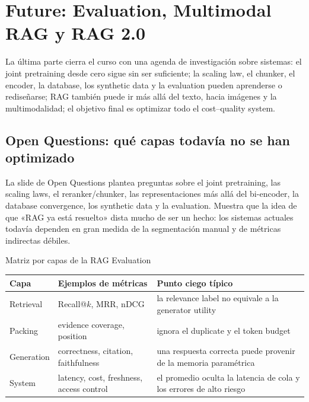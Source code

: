 \section{Future: Evaluation, Multimodal RAG y RAG 2.0}

La última parte cierra el curso con una agenda de investigación sobre sistemas: el joint pretraining desde cero sigue sin ser suficiente; la scaling law, el chunker, el encoder, la database, los synthetic data y la evaluation pueden aprenderse o rediseñarse; RAG también puede ir más allá del texto, hacia imágenes y la multimodalidad; el objetivo final es optimizar todo el cost--quality system.

\subsection{Open Questions: qué capas todavía no se han optimizado}

La slide de Open Questions plantea preguntas sobre el joint pretraining, las scaling laws, el reranker/chunker, las representaciones más allá del bi-encoder, la database convergence, los synthetic data y la evaluation. Muestra que la idea de que «RAG ya está resuelto» dista mucho de ser un hecho: los sistemas actuales todavía dependen en gran medida de la segmentación manual y de métricas indirectas débiles.


\begin{knowledgebox}{Matriz por capas de la RAG Evaluation}
\begin{tabularx}{\textwidth}{L{0.18\textwidth}>{\raggedright\arraybackslash}X >{\raggedright\arraybackslash}X}
\toprule
Capa & Ejemplos de métricas & Punto ciego típico \\
\midrule
Retrieval & Recall@$k$, MRR, nDCG & la relevance label no equivale a la generator utility \\
Packing & evidence coverage, position & ignora el duplicate y el token budget \\
Generation & correctness, citation, faithfulness & una respuesta correcta puede provenir de la memoria paramétrica \\
System & latency, cost, freshness, access control & el promedio oculta la latencia de cola y los errores de alto riesgo \\
\bottomrule
\end{tabularx}
\end{knowledgebox}

